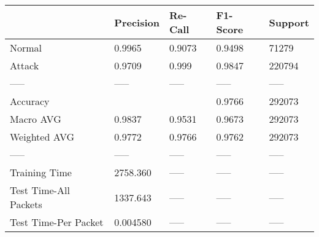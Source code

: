\begin{tabular}{lllll}
\toprule
{} & Precision & Re-Call & F1-Score & Support \\
\midrule
Normal                &    0.9965 &  0.9073 &   0.9498 &   71279 \\
Attack                &    0.9709 &   0.999 &   0.9847 &  220794 \\
-----                 &     ----- &   ----- &    ----- &   ----- \\
Accuracy              &           &         &   0.9766 &  292073 \\
Macro AVG             &    0.9837 &  0.9531 &   0.9673 &  292073 \\
Weighted AVG          &    0.9772 &  0.9766 &   0.9762 &  292073 \\
-----                 &     ----- &   ----- &    ----- &   ----- \\
Training Time         &  2758.360 &   ----- &    ----- &   ----- \\
Test Time-All Packets &  1337.643 &   ----- &    ----- &   ----- \\
Test Time-Per Packet  &  0.004580 &   ----- &    ----- &   ----- \\
\bottomrule
\end{tabular}
